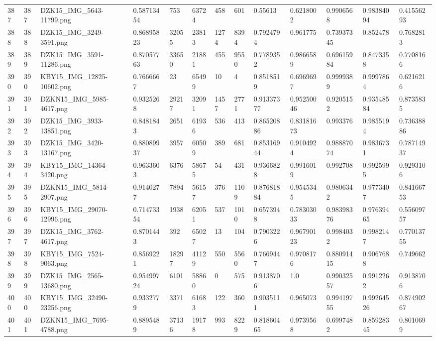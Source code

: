 \documentclass[11pt, a4paper, twoside]{report}
\begin{document}
\begin{longtable}[c]{@{}lllllllllllll@{}}
387 & 387 & DZK15\_IMG\_5643-11799.png & 0.58713454 & 753 & 63724 & 458 & 601 & 0.55613 & 0.6218002 & 0.9906568 & 0.98384094 & 0.41556293 \\
388 & 388 & DZK15\_IMG\_3249-3591.png & 0.86895823 & 32055 & 23813 & 1274 & 8394 & 0.7924794 & 0.961775 & 0.73937345 & 0.852478 & 0.7682813 \\
389 & 389 & DZK15\_IMG\_3591-11286.png & 0.87057763 & 33650 & 21881 & 455 & 9550 & 0.7789352 & 0.9866589 & 0.69615984 & 0.8473358 & 0.7708166 \\
390 & 390 & KBY15\_IMG\_12825-10602.png & 0.7666667 & 23 & 65499 & 10 & 4 & 0.8518519 & 0.6969697 & 0.9999389 & 0.9997864 & 0.6216216 \\
391 & 391 & DZKN15\_IMG\_5985-4617.png & 0.9325268 & 29217 & 32091 & 1457 & 2771 & 0.91337377 & 0.95250046 & 0.9205152 & 0.93548584 & 0.8735835 \\
392 & 392 & DZK15\_IMG\_3933-13851.png & 0.8481843 & 2651 & 61936 & 536 & 413 & 0.86520886 & 0.83181673 & 0.993376 & 0.9855194 & 0.73638886 \\
393 & 393 & DZK15\_IMG\_3420-13167.png & 0.88089937 & 3957 & 60509 & 389 & 681 & 0.85316944 & 0.9104924 & 0.98887074 & 0.9836731 & 0.78714937 \\
394 & 394 & KBY15\_IMG\_14364-3420.png & 0.9633603 & 6376 & 58675 & 54 & 431 & 0.9366828 & 0.9916019 & 0.992708 & 0.9925995 & 0.9293106 \\
395 & 395 & DZKN15\_IMG\_5814-2907.png & 0.9140277 & 7894 & 56157 & 376 & 1109 & 0.87681884 & 0.9545345 & 0.9806342 & 0.9773407 & 0.84166753 \\
396 & 396 & KBY15\_IMG\_29070-12996.png & 0.71473354 & 1938 & 62051 & 537 & 1010 & 0.6573948 & 0.78303033 & 0.98398376 & 0.97639465 & 0.55609757 \\
397 & 397 & DZK15\_IMG\_3762-4617.png & 0.8701443 & 392 & 65027 & 13 & 104 & 0.7903226 & 0.96790123 & 0.9984032 & 0.9982147 & 0.77013755 \\
398 & 398 & KBY15\_IMG\_7524-9063.png & 0.8569221 & 18297 & 41129 & 550 & 5560 & 0.7669447 & 0.9708176 & 0.88091415 & 0.9067688 & 0.749662 \\
399 & 399 & DZK15\_IMG\_2565-13680.png & 0.95499724 & 6101 & 58860 & 0 & 575 & 0.9138706 & 1.0 & 0.99032557 & 0.9912262 & 0.9138706 \\
400 & 400 & KBY15\_IMG\_32490-23256.png & 0.9332779 & 3371 & 61683 & 122 & 360 & 0.9035111 & 0.965073 & 0.99419755 & 0.99264526 & 0.87490267 \\
401 & 401 & DZKN15\_IMG\_7695-4788.png & 0.8895489 & 37136 & 19178 & 993 & 8229 & 0.81860465 & 0.9739568 & 0.6997482 & 0.85928345 & 0.8010699 \\

\end{longtable}
\end{document}

